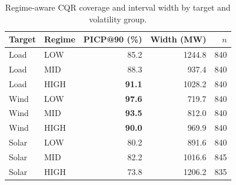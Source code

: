 \begin{table}[htbp]
\centering
\small
\caption{Regime-aware CQR coverage and interval width by target and volatility group.}
\label{tab:TBL03_CQR_GROUP_COVERAGE}
\setlength{\tabcolsep}{5pt}
\renewcommand{\arraystretch}{1.05}
\begin{tabular}{llrrr}
\toprule
Target & Regime & PICP@90 (\%) & Width (MW) & $n$ \\
\midrule
Load & LOW & 85.2 & 1244.8 & 840 \\
Load & MID & 88.3 & 937.4 & 840 \\
Load & HIGH & \textbf{91.1} & 1028.2 & 840 \\
\midrule
Wind & LOW & \textbf{97.6} & 719.7 & 840 \\
Wind & MID & \textbf{93.5} & 812.0 & 840 \\
Wind & HIGH & \textbf{90.0} & 969.9 & 840 \\
\midrule
Solar & LOW & 80.2 & 891.6 & 840 \\
Solar & MID & 82.2 & 1016.6 & 845 \\
Solar & HIGH & 73.8 & 1206.2 & 835 \\
\bottomrule
\end{tabular}
\end{table}